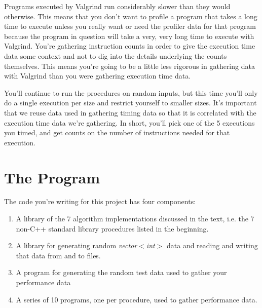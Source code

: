\documentclass[]{tufte-handout}
\begin{document}
Programs executed by Valgrind run considerably slower than they would otherwise. This means that you don't want to profile a program that takes a long time to execute unless you really want or need the profiler data for that program because the program in question will take a very, very long time to execute with Valgrind. You're gathering instruction counts in order to give the execution time data some context and not to dig into the details underlying the counts themselves. This means you're going to be a little less rigorous in gathering data with Valgrind than you were gathering execution time data.

You'll continue to run the procedures on random inputs, but this time you'll only do a single execution per size and restrict yourself to smaller sizes. It's important that we reuse data used in gathering timing data so that it is correlated with the execution time data we're gathering. In short, you'll pick one of the 5 executions you timed, and get counts on the number of instructions needed for that execution.  

\section{The Program}

The code you're writing for this project has four components:
\begin{enumerate}
\item A library of the 7 algorithm implementations discussed in the text, i.e. the 7 non-C++ standard library procedures listed in the beginning.
\item A library for generating random \textit{vector$<$int$>$} data and reading and writing that data from and to files.
\item A program for generating the random test data used to gather your performance data
\item A series of 10 programs, one per procedure, used to gather performance data.
\end{enumerate}
\end{document}
